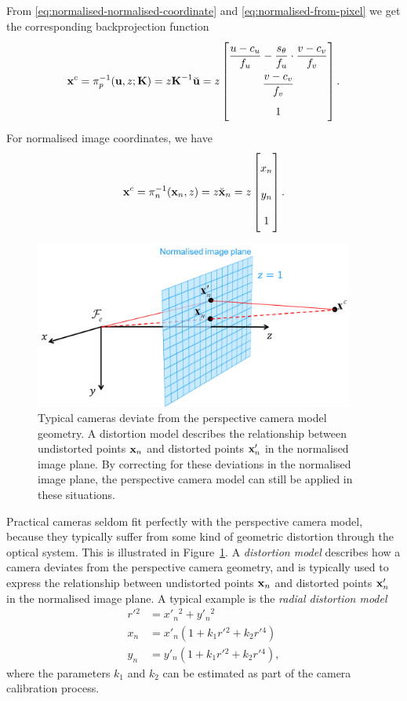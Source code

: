 From \eqref{eq:normalised-normalised-coordinate} and \eqref{eq:normalised-from-pixel} we get the corresponding backprojection function
\begin{equation}
  \vecx^c = \pi^{-1}_p(\vecu, z; \matK) = z \matK^{-1} \breve{\vecu} = z
  \renewcommand\arraystretch{2}
  \begin{bmatrix}
    \dfrac{u - c_u}{f_u} - \dfrac{s_\theta}{f_u} \cdot \dfrac{v - c_v}{f_v}\\
    \dfrac{v - c_v}{f_v}\\
    1
  \end{bmatrix}.
\end{equation}
For normalised image coordinates, we have
\begin{equation} \label{eq:normalised-backprojection-function}
  \vecx^c = \pi^{-1}_n(\vecx_n, z) = z \breve{\vecx}_n = z
  \begin{bmatrix}
    x_n\\
    y_n\\
    1
  \end{bmatrix}.
\end{equation}

\begin{figure}[htb]
    \centering
    \includegraphics[height=5.5cm]{figures/radial-distortion.png}
    \caption{Typical cameras deviate from the perspective camera model geometry.
    A distortion model describes the relationship between undistorted points ${\boldsymbol{\mathbf{x}}}_n$ and distorted points ${\boldsymbol{\mathbf{x}}}'_n$ in the normalised image plane.
    By correcting for these deviations in the normalised image plane, the perspective camera model can still be applied in these situations.
    }
    \label{fig:radial-distortion}
\end{figure}
Practical cameras seldom fit perfectly with the perspective camera model, because they typically suffer from some kind of geometric distortion through the optical system.
This is illustrated in Figure~\ref{fig:radial-distortion}.
A \emph{distortion model} describes how a camera deviates from the perspective camera geometry, and is typically used to express the relationship between undistorted points ${\boldsymbol{\mathbf{x}}}_n$ and distorted points ${\boldsymbol{\mathbf{x}}}'_n$ in the normalised image plane.
A typical example is the \emph{radial distortion model}
\begin{align}
  r'{}^2 &= x'_n{}^2 + y'_n{}^2\\
  x_n &= x'_n (1 + k_1 r'{}^2 + k_2 r'{}^4)\\
  y_n &= y'_n (1 + k_1 r'{}^2 + k_2 r'{}^4),
\end{align}
where the parameters $k_1$ and $k_2$ can be estimated as part of the camera calibration process.

